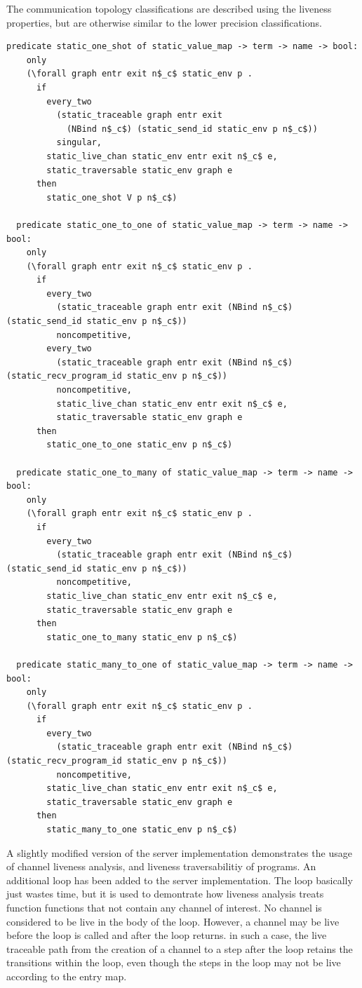 \documentclass[10pt]{article}
\begin{document}
The communication topology classifications are described using the liveness properties, but
are otherwise similar to the lower precision classifications.

\begin{lstlisting}[language=logic, mathescape]
  predicate static_one_shot of static_value_map -> term -> name -> bool:
    only
    (\forall graph entr exit n$_c$ static_env p . 
      if
        every_two
          (static_traceable graph entr exit
            (NBind n$_c$) (static_send_id static_env p n$_c$))
          singular, 
        static_live_chan static_env entr exit n$_c$ e, 
        static_traversable static_env graph e
      then
        static_one_shot V p n$_c$)

  predicate static_one_to_one of static_value_map -> term -> name -> bool:
    only
    (\forall graph entr exit n$_c$ static_env p .
      if
        every_two
          (static_traceable graph entr exit (NBind n$_c$) (static_send_id static_env p n$_c$))
          noncompetitive, 
        every_two
          (static_traceable graph entr exit (NBind n$_c$) (static_recv_program_id static_env p n$_c$))
          noncompetitive,
          static_live_chan static_env entr exit n$_c$ e,
          static_traversable static_env graph e
      then
        static_one_to_one static_env p n$_c$)

  predicate static_one_to_many of static_value_map -> term -> name -> bool:
    only
    (\forall graph entr exit n$_c$ static_env p .
      if
        every_two
          (static_traceable graph entr exit (NBind n$_c$) (static_send_id static_env p n$_c$))
          noncompetitive,
        static_live_chan static_env entr exit n$_c$ e,
        static_traversable static_env graph e
      then
        static_one_to_many static_env p n$_c$)

  predicate static_many_to_one of static_value_map -> term -> name -> bool:
    only
    (\forall graph entr exit n$_c$ static_env p .
      if
        every_two
          (static_traceable graph entr exit (NBind n$_c$) (static_recv_program_id static_env p n$_c$))
          noncompetitive, 
        static_live_chan static_env entr exit n$_c$ e,
        static_traversable static_env graph e
      then
        static_many_to_one static_env p n$_c$)
  \end{lstlisting}


A slightly modified version of the server implementation demonstrates the usage of channel liveness
analysis, and liveness traversabilitiy of programs.  An additional loop has been added to the
server implementation.  The loop basically just wastes time, but it is used to demontrate how
liveness analysis treats function functions that not contain
any channel of interest.  No channel is
considered to be live in the body of the loop.  However, a channel may be live before the loop is
called and after the loop returns.  in such a case, the live traceable path from the creation of a
channel to a step after the loop retains the transitions within the loop, even though the steps in
the loop may not be live according to the entry map.
\end{document}
